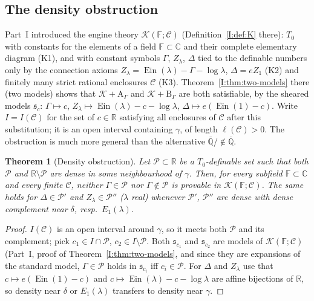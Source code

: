 \documentclass[11pt,a4paper]{article}
\newcommand{\R}{\mathbb R}
\newcommand{\C}{\mathbb C}
\newcommand{\Qbar}{\overline{\mathbb Q}}
\newcommand{\Ein}{\operatorname{Ein}}
\newcommand{\Fld}{\mathbb F}
\newcommand{\Th}{\mathcal K}
\newcommand{\shear}{\mathfrak s}
\newcommand{\Tz}{T_0}
\newcommand{\Pc}{\mathcal P}
\newtheorem{theorem}{Theorem}[section]
\theoremstyle{definition}
\theoremstyle{remark}
\numberwithin{equation}{section}
\begin{document}
\subsection{The density obstruction}

Part~I introduced the engine theory $\Th(\Fld;\mathcal C)$ (Definition~\ref{I:def:K} there): $\Tz$
with constants for the elements of a field $\Fld\subset\C$ and their complete elementary
diagram (K1), and with constant symbols $\Gamma$, $Z_\lambda$, $\Delta$ tied to the
definable numbers only by the connection axioms $Z_\lambda=\Ein(\lambda)-\Gamma-\log\lambda$,
$\Delta=eZ_1$ (K2) and finitely many strict rational enclosures $\mathcal C$ (K3). Theorem~\ref{I:thm:two-models} there (two models)
shows that $\Th+\mathrm A_\Gamma$ and $\Th+\mathrm B_\Gamma$ are both satisfiable, by the
sheared models $\shear_c$: $\Gamma\mapsto c$, $Z_\lambda\mapsto\Ein(\lambda)-c-\log\lambda$,
$\Delta\mapsto e(\Ein(1)-c)$. Write $I=I(\mathcal C)$ for the set of $c\in\R$ satisfying
all enclosures of $\mathcal C$ after this substitution; it is an open interval containing
$\gamma$, of length $\ell(\mathcal C)>0$. The obstruction is much more general than the
alternative $\Qbar$/$\notin\Qbar$.

\begin{theorem}[Density obstruction]\label{III:thm:density}
Let $\Pc\subset\R$ be a $\Tz$-definable set such that both $\Pc$ and $\R\setminus\Pc$
are dense in some neighbourhood of $\gamma$. Then, for every subfield $\Fld\subset\C$ and
every finite $\mathcal C$, neither $\Gamma\in\Pc$ nor $\Gamma\notin\Pc$ is provable in
$\Th(\Fld;\mathcal C)$. The same holds for $\Delta\in\Pc'$ and $Z_\lambda\in\Pc''$
($\lambda$ real) whenever $\Pc'$, $\Pc''$ are dense with dense complement near $\delta$,
resp.\ $E_1(\lambda)$.
\end{theorem}
\begin{proof}
$I(\mathcal C)$ is an open interval around $\gamma$, so it meets both $\Pc$ and its
complement; pick $c_1\in I\cap\Pc$, $c_2\in I\setminus\Pc$. Both $\shear_{c_1}$ and
$\shear_{c_2}$ are models of $\Th(\Fld;\mathcal C)$ (Part~I, proof of Theorem~\ref{I:thm:two-models}, and
since they are expansions of the standard model, $\Gamma\in\Pc$ holds in $\shear_{c_i}$
iff $c_i\in\Pc$. For $\Delta$ and $Z_\lambda$ use that $c\mapsto e(\Ein(1)-c)$ and
$c\mapsto\Ein(\lambda)-c-\log\lambda$ are affine bijections of $\R$, so density near
$\delta$ or $E_1(\lambda)$ transfers to density near $\gamma$.
\end{proof}
\end{document}
